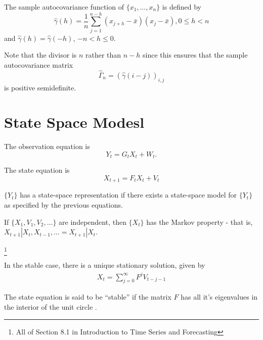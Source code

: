 \begin{defn}
  \label{defn:time_series:12}
  The sample autocovariance function of $\{ x_{1}, \dots, x_{n} \}$ is
  defined by
  \begin{equation}
    \label{eq:7}
    \hat \gamma(h) = \frac{1}{n} \sum_{j=1}^{n-h} (x_{j+h} - \bar
    x)(x_{j} - \bar x), 0 \leq h < n
  \end{equation} and $\hat \gamma(h) = \hat \gamma(-h)$, $-n < h \leq
  0$.

  Note that the divisor is $n$ rather than $n-h$ since this ensures
  that the sample autocovariance matrix
  \begin{equation}
    \label{eq:8}
    \hat \Gamma_{n} = (\hat \gamma(i - j))_{i, j}
  \end{equation} is positive semidefinite.
\end{defn}








\section{State Space Modesl}
\label{sec:state-space-modesl}



\begin{defn}
  \label{defn:time_series:13}
  The observation equation is
  \begin{equation}
    \label{eq:10}
    Y_{t} = G_{t} X_{t} + W_{t}.
  \end{equation}

  The state equation is
  \begin{equation}
    \label{eq:11}
    X_{t+1} = F_{t} X_{t} + V_{t}
  \end{equation}
  
  $\{ Y_{t} \}$ has a state-space representation if there exists a
  state-space model for $\{ Y_{t} \}$ as specified by the previous
  equations.
\end{defn}

\begin{thm}[De Finitte]
  \label{defn:time_series:14}
  If $\{ X_{1}, V_{1}, V_{2}, \dots \} $ are independent, then
  $\{X_{t} \}$ has the Markov property - that is, $X_{t+1} | X_{t},
  X_{t-1}, \dots = X_{t+1} | X_{t}$.
\end{thm}


\footnote{All of Section 8.1 in Introduction to Time Series and
  Forecasting}

In the stable case, there is a unique stationary solution, given by
\begin{align}
  \label{eq:12}
  X_{t} = \sum_{j=0}^{\infty} F^{j} V_{t - j - 1}
\end{align}


\begin{defn}
  \label{defn:time_series:15}
  The state equation is said to be ``stable'' if the matrix $F$ has
  all it's eigenvalues in the interior of the unit circle .  
\end{defn}

